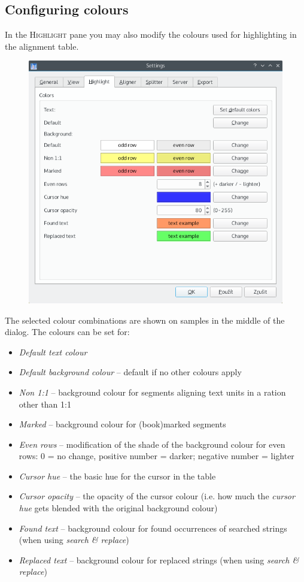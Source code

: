 \documentclass[a4paper,10pt,oneside]{book}
\newcommand{\menu}[1]{\textsc{#1}}
\begin{document}
\subsection{Configuring colours}

In the \menu{Highlight} pane you may also modify the colours used for highlighting in the alignment table.

\begin{figure}[htb]
 \includegraphics[width=\textwidth]{screenshots/settings_highlight.png}
\end{figure}

The selected colour combinations are shown on samples in the middle of the dialog. The colours can be set for:

\begin{itemize}
 \item \emph{Default text colour}
 \item \emph{Default background colour} -- default if no other colours apply
 \item \emph{Non 1:1} -- background colour for segments aligning text units in a ration other than 1:1
 \item \emph{Marked} -- background colour for (book)marked segments
 \item \emph{Even rows} -- modification of the shade of the background colour for even rows: 0 = no change, positive number = darker; negative number = lighter
 \item \emph{Cursor hue} -- the basic hue for the cursor in the table
 \item \emph{Cursor opacity} -- the opacity of the cursor colour (i.e. how much the \emph{cursor hue} gets blended with the original background colour)
 \item \emph{Found text} -- background colour for found occurrences of searched strings (when using \emph{search \& replace})
 \item \emph{Replaced text} -- background colour for replaced strings (when using \emph{search \& replace})
\end{itemize}
\end{document}
